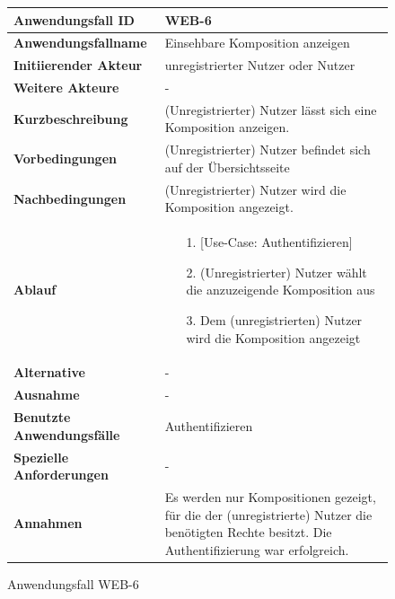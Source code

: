 \begin{figure}[h]
	\centering
	\begin{tabularx}{\textwidth}{ X | X }
		\textbf{Anwendungsfall ID} & WEB-6 \\ \hline
		\textbf{Anwendungsfallname} & Einsehbare Komposition anzeigen \\ \hline
		\textbf{Initiierender Akteur} & unregistrierter Nutzer oder Nutzer\\ \hline
		\textbf{Weitere Akteure} & - \\ \hline
		\textbf{Kurzbeschreibung} & (Unregistrierter) Nutzer  lässt sich eine Komposition anzeigen. \\ \hline
		\textbf{Vorbedingungen} & (Unregistrierter) Nutzer befindet sich auf der Übersichtsseite \\ \hline
		\textbf{Nachbedingungen} & (Unregistrierter) Nutzer wird die Komposition angezeigt. \\ \hline
		\textbf{Ablauf} &
		\begin{enumerate}
			\item[1.] [Use-Case: Authentifizieren]
			\item[2.] (Unregistrierter) Nutzer wählt die anzuzeigende Komposition aus
			\item[3.] Dem (unregistrierten) Nutzer wird die Komposition angezeigt
		\end{enumerate} \\ \hline
		\textbf{Alternative} & - \\ \hline
		\textbf{Ausnahme} & - \\ \hline
		\textbf{Benutzte Anwendungsfälle} & Authentifizieren \\ \hline
		\textbf{Spezielle Anforderungen} & - \\ \hline
		\textbf{Annahmen} & Es werden nur Kompositionen gezeigt, für die der (unregistrierte) Nutzer die benötigten Rechte besitzt. Die Authentifizierung war erfolgreich.
	\end{tabularx}
	\caption{Anwendungsfall WEB-6}
	\label{fig:anwendungsfall-server-tabelle-web-6}
\end{figure}